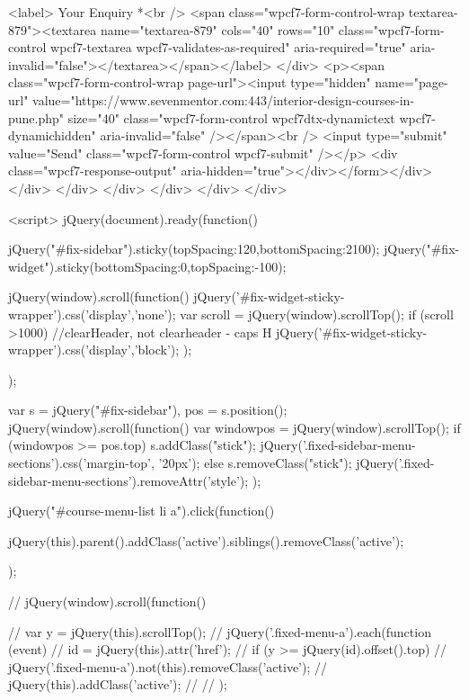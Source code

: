 {{{{{{{<label> Your Enquiry *<br />
<span class="wpcf7-form-control-wrap textarea-879"><textarea name="textarea-879" cols="40" rows="10" class="wpcf7-form-control wpcf7-textarea wpcf7-validates-as-required" aria-required="true" aria-invalid="false"></textarea></span></label>
</div>
<p><span class="wpcf7-form-control-wrap page-url"><input type="hidden" name="page-url" value="https://www.sevenmentor.com:443/interior-design-courses-in-pune.php" size="40" class="wpcf7-form-control wpcf7dtx-dynamictext wpcf7-dynamichidden" aria-invalid="false" /></span><br />
<input type="submit" value="Send" class="wpcf7-form-control wpcf7-submit" /></p>
<div class="wpcf7-response-output" aria-hidden="true"></div></form></div>
</div>
</div>
</div>
</div>
</div>
</div>


<script>
   jQuery(document).ready(function(){
      jQuery("#fix-sidebar").sticky({topSpacing:120,bottomSpacing:2100});
      jQuery("#fix-widget").sticky({bottomSpacing:0,topSpacing:-100});

        jQuery(window).scroll(function() { 
            jQuery('#fix-widget-sticky-wrapper').css('display','none');   
            var scroll = jQuery(window).scrollTop();
            if (scroll >1000) {
                //clearHeader, not clearheader - caps H
                jQuery('#fix-widget-sticky-wrapper').css('display','block');
            }
        });
      });

   var s = jQuery("#fix-sidebar"),
    pos = s.position();                    
      jQuery(window).scroll(function() {
        var windowpos = jQuery(window).scrollTop();
        if (windowpos >= pos.top) {
          s.addClass("stick");
          jQuery('.fixed-sidebar-menu-sections').css('margin-top', '20px');
        } else {
          s.removeClass("stick"); 
          jQuery('.fixed-sidebar-menu-sections').removeAttr('style');
        }
      });

      jQuery("#course-menu-list li a").click(function() {
        jQuery(this).parent().addClass('active').siblings().removeClass('active');

      });

      // jQuery(window).scroll(function() {
      //   var y = jQuery(this).scrollTop();
      //   jQuery('.fixed-menu-a').each(function (event) {
      //     id = jQuery(this).attr('href');
      //     if (y >= jQuery(id).offset().top) {
      //       jQuery('.fixed-menu-a').not(this).removeClass('active');
      //       jQuery(this).addClass('active');
      //     }
      //   });

}}}}}}}}
